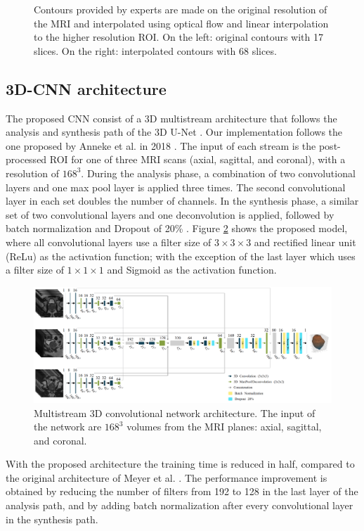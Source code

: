 \begin{figure}[h]
    \caption{Contours provided by experts are made on the original resolution of the MRI and interpolated using optical flow and linear interpolation to the higher resolution ROI. On the left: original contours with 17 slices. On the right: interpolated contours with 68 slices.}
    \label{fig:of1}
\end{figure}

\subsection{3D-CNN architecture}
The proposed CNN consist of a 3D multistream architecture that follows the analysis and synthesis path of the 3D U-Net \cite{cciccek20163d}. Our implementation follows the one proposed by Anneke et al. in 2018  \cite{anneke}. The input of each stream is the post-processed ROI for one of three MRI scans (axial, sagittal, and coronal), with a resolution of $168^3$. During the analysis phase, a combination of two convolutional layers and one max pool layer is applied three times. The second convolutional layer in each set doubles the number of channels.  In the synthesis phase, a similar set of two convolutional layers and one deconvolution is applied, followed by batch normalization and Dropout of 20\% \cite{hinton2012improving}.
Figure \ref{fig:nn} shows the proposed model, where all convolutional layers use a filter size of $3 \times 3 \times 3$ and rectified linear unit (ReLu) as the activation function; with the exception of the last layer which uses a filter size of $1 \times 1 \times 1$  and Sigmoid as the activation function. 
\begin{figure}[h]
    \centering
    \includegraphics[totalheight=.275\textheight]{figures/methodology/NN.png}
    \caption{Multistream 3D convolutional network architecture. The input of the network are $168^3$ volumes from the MRI planes: axial, sagittal, and coronal. }
    \label{fig:nn}
\end{figure}

With the proposed architecture the training time is reduced in half, compared to the original architecture of Meyer et al. \cite{anneke}. The performance improvement is obtained by reducing the number of filters from 192 to 128 in the last layer of the analysis path, and by adding batch normalization after every convolutional layer in the synthesis path.

